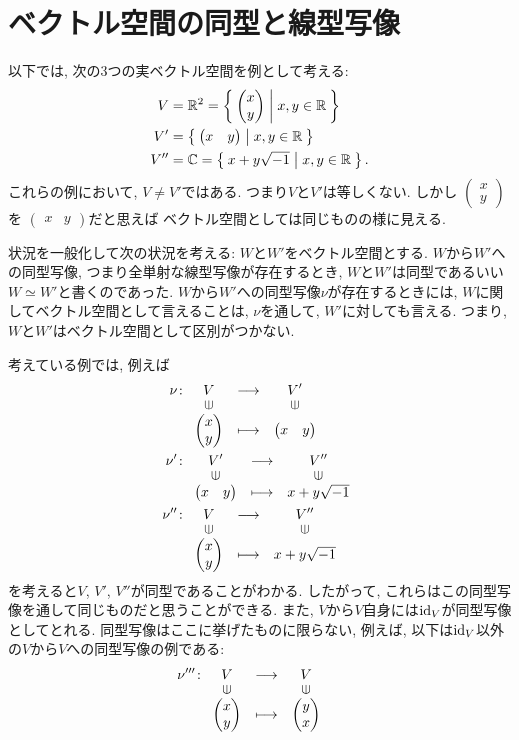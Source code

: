\section{ベクトル空間の同型と線型写像}
以下では, 次の3つの実ベクトル空間を例として考える:
\begin{align*}
  V&=\mathbb{R}^2=\Set{\begin{pmatrix}x\\y\end{pmatrix}|x,y\in\mathbb{R}}\\
  V'&=\Set{\begin{pmatrix}x&y\end{pmatrix}|x,y\in\mathbb{R}}\\
  V''&=\mathbb{C}=\Set{x+y\sqrt{-1}|x,y\in\mathbb{R}}.
\end{align*}
これらの例において,
$V\neq V'$ではある.
つまり$V$と$V'$は等しくない.
しかし
$\begin{pmatrix}x\\y\end{pmatrix}$を
$\begin{pmatrix}x&y\end{pmatrix}$だと思えば
ベクトル空間としては同じものの様に見える.

状況を一般化して次の状況を考える:
$W$と$W'$をベクトル空間とする.
$W$から$W'$への同型写像, つまり全単射な線型写像が存在するとき,
$W$と$W'$は同型であるいい$W\simeq W'$と書くのであった.
$W$から$W'$への同型写像$\nu$が存在するときには,
$W$に関してベクトル空間として言えることは,
$\nu$を通して, $W'$に対しても言える.
つまり, $W$と$W'$はベクトル空間として区別がつかない.

考えている例では, 例えば
\begin{align*}
  \nu\colon&
  \Shazo{V}{V'}
        {\begin{pmatrix}x\\y\end{pmatrix}}{\begin{pmatrix}x&y\end{pmatrix}}
        \\
  \nu'\colon&
  \Shazo{V'}{V''}
        {\begin{pmatrix}x&y\end{pmatrix}}{x+y\sqrt{-1}}
        \\
  \nu''\colon&
  \Shazo{V}{V''}
        {\begin{pmatrix}x\\y\end{pmatrix}}{x+y\sqrt{-1}}
\end{align*}
を考えると$V$, $V'$, $V''$が同型であることがわかる.
したがって, これらはこの同型写像を通して同じものだと思うことができる.
また, $V$から$V$自身には$\operatorname{id}_V$が同型写像としてとれる.
同型写像はここに挙げたものに限らない,
例えば, 以下は$\operatorname{id}_V$以外の$V$から$V$への同型写像の例である:
\begin{align*}
  \nu'''\colon&
  \Shazo{V}{V}
        {\begin{pmatrix}x\\y\end{pmatrix}}{\begin{pmatrix}y\\x\end{pmatrix}}
\end{align*}


